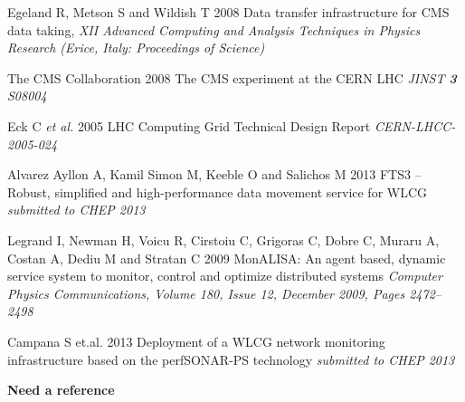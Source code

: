 

\begin{thebibliography}{1}

  Egeland R, Metson S and Wildish T 2008 Data transfer infrastructure for CMS data taking,  {\it XII Advanced Computing and Analysis Techniques in Physics Research (Erice, Italy: Proceedings of Science)}

The CMS Collaboration 2008 The CMS experiment at the CERN LHC {\it JINST {\bf 3} S08004}

Eck C {\it et al.} 2005 LHC Computing Grid Technical Design Report {\it CERN-LHCC-2005-024}

Alvarez Ayllon A, Kamil Simon M, Keeble O and Salichos M 2013 FTS3 – Robust, simplified and high-performance data movement service for WLCG {\it submitted to CHEP 2013}

Legrand I, Newman H, Voicu R, Cirstoiu C, Grigoras C, Dobre C, Muraru A, Costan A, Dediu M and Stratan C 2009 MonALISA: An agent based, dynamic service system to monitor, control and optimize distributed systems {\it Computer Physics Communications, Volume 180, Issue 12, December 2009, Pages 2472–2498}

  Campana S et.al. 2013 Deployment of a WLCG network monitoring infrastructure based on the perfSONAR-PS technology {\it submitted to CHEP 2013}

 \textbf{Need a reference}


\end{thebibliography}
